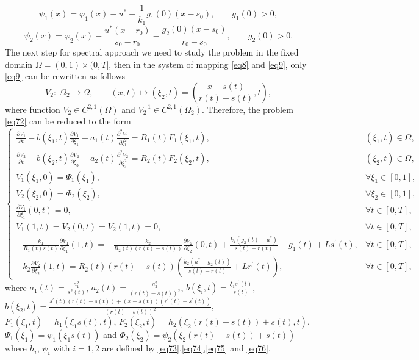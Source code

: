 \documentclass[preprint,12pt,authoryear]{elsarticle}
\begin{document}
\begin{equation}\label{eq75}
    \psi_1(x)=\varphi_1(x)-u^*+\frac{1}{k_1}g_1(0)(x-s_0),\quad\quad g_1(0)>0,
\end{equation}
\begin{equation}\label{eq76}
    \psi_2(x)=\varphi_2(x)-\frac{u^*(x-r_0)}{s_0-r_0}-\frac{g_2(0)(x-s_0)}{r_0-s_0},\quad\quad g_2(0)>0.
\end{equation}
The next step for spectral approach we need to study the problem in the fixed domain $\Omega=(0,1)\times(0,T]$, then in the system of mapping \eqref{eq8} and \eqref{eq9}, only \eqref{eq9} can be rewritten as follows
\begin{equation}\label{eq77}
    V_2:\;\Omega_2\rightarrow\Omega,\quad\quad (x,t)\mapsto (\xi_2,t)=\left(\frac{x-s(t)}{r(t)-s(t)},t\right),
\end{equation}
where function $V_2\in C^{2,1}(\Omega)$ and $V_2^{-1}\in C^{2,1}(\Omega_2)$. Therefore, the problem \eqref{eq72} can be reduced to the form
\begin{equation}\label{eq78}
    \begin{cases}
        \frac{\partial V_1}{\partial t}-b(\xi_1,t)\frac{\partial V_1}{\partial \xi_1}-a_1(t)\frac{\partial^2 V_1}{\partial \xi_1^2}=R_1(t)F_1(\xi_1,t), &(\xi_1,t)\in\Omega,\\
        \frac{\partial V_2}{\partial t}-b(\xi_2,t)\frac{\partial V_2}{\partial \xi_3}-a_2(t)\frac{\partial^2 V_2}{\partial \xi_3^2}=R_2(t)F_2(\xi_2,t), &(\xi_2,t)\in\Omega,\\
        V_1(\xi_1,0)=\Psi_1(\xi_1),&\forall \xi_1\in[0,1],\\
        V_2(\xi_2,0)=\Phi_2(\xi_2),&\forall \xi_2\in[0,1],\\
        \frac{\partial V_1}{\partial \xi_1}(0,t)=0, & \forall t\in[0,T],\\
        V_1(1,t)=V_2(0,t)=V_2(1,t)=0,&\forall t\in[0,T],\\
        -\frac{k_1}{R_1(t)s(t)}\frac{\partial V_1}{\partial\xi_1}(1,t)=-\frac{k_2}{R_2(t)(r(t)-s(t))}\frac{\partial V_2}{\partial \xi_2}(0,t)+\frac{k_2(g_2(t)-u^*)}{s(t)-r(t)}-g_1(t)+Ls^{\prime}(t),&\forall t\in[0,T],\\
        -k_2\frac{\partial V_2}{\partial\xi_2}(1,t)=R_2(t)(r(t)-s(t))\left(\frac{k_2(u^*-g_2(t))}{s(t)-r(t)}+Lr^{\prime}(t)\right),&\forall t\in[0,T],
    \end{cases}
\end{equation}
where $a_1(t)=\frac{a_1^2}{s^2(t)}$, $a_2(t)=\frac{a_2^2}{(r(t)-s(t))^2}$, $b(\xi_i,t)=\frac{\xi_1 s^{\prime}(t)}{s(t)}$, $b(\xi_2,t)=\frac{s^{\prime}(t)(r(t)-s(t))+(x-s(t))(r^{\prime}(t)-s^{\prime}(t))}{(r(t)-s(t))^2}$, $F_1(\xi_1,t)=h_1(\xi_1s(t),t)$, $F_2(\xi_2,t)=h_2(\xi_2(r(t)-s(t))+s(t),t)$, $\Psi_1(\xi_1)=\psi_1(\xi_1s(t))$ and $\Phi_2(\xi_2)=\psi_2(\xi_2(r(t)-s(t))+s(t))$ where $h_i$, $\psi_i$ with $i=1,2$ are defined by \eqref{eq73},\eqref{eq74},\eqref{eq75} and \eqref{eq76}.
\end{document}

